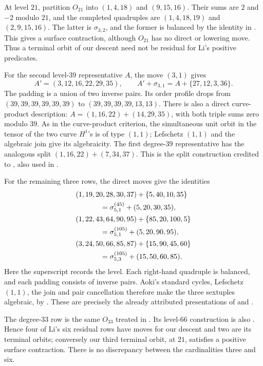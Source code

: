 At level $21$, partition $O_{21}$ into $(1,4,18)$ and $(9,15,16)$.
Their sums are $2$ and $-2$ modulo $21$, and the completed quadruples
are $(1,4,18,19)$ and $(2,9,15,16)$. The latter is
$\sigma_{3,2}$, and the former is balanced by the identity in
. This gives a surface contraction, although
$O_{21}$ has no direct or lowering move. Thus a terminal orbit of our
descent need not be residual for Li's positive predicates.

For the second level-$39$ representative $A$, the move $(3,1)$ gives
\[
 A'=(3,12,16,22,29,35),\qquad
 A'+\sigma_{3,1}=A+\{27,12,3,36\}.
\]
The padding is a union of two inverse pairs. Its order profile drops
from $(39,39,39,39,39,39)$ to $(39,39,39,39,13,13)$.
There is also a direct curve-product description:
$A=(1,16,22)+(14,29,35)$, with both triple sums zero modulo $39$.
As in the curve-product criterion, the simultaneous unit orbit in the
tensor of the two curve $H^1$'s is of type $(1,1)$; Lefschetz $(1,1)$
and the algebraic join give its algebraicity. The first degree-$39$
representative has the analogous split $(1,16,22)+(7,34,37)$.
This is the split construction credited to \cite{Jum26}, also used in
\cite[\S3.2]{Li26b}.

For the remaining three rows, the direct moves give the identities
\begin{align*}
 &(1,19,20,28,30,37)+\{5,40,10,35\}\\
 &\hspace{12mm}=\sigma_{5,1}^{(45)}+(5,20,30,35),\\
 &(1,22,43,64,90,95)+\{85,20,100,5\}\\
 &\hspace{12mm}=\sigma_{5,1}^{(105)}+(5,20,90,95),\\
 &(3,24,50,66,85,87)+\{15,90,45,60\}\\
 &\hspace{12mm}=\sigma_{5,3}^{(105)}+(15,50,60,85).
\end{align*}
Here the superscript records the level. Each right-hand quadruple is
balanced, and each padding consists of inverse pairs. Aoki's standard
cycles, Lefschetz $(1,1)$, the join and pair cancellation therefore make
the three sextuples algebraic, by .
These are precisely the already attributed presentations of
\cite{Jum26} and \cite[(3.4)--(3.5)]{Li26b}.

The degree-$33$ row is the same $O_{33}$ treated in
. Its level-$66$ construction is also
\cite[Theorem~1.4]{Jum26}. Hence four of Li's six residual rows have
moves for our descent and two are its terminal orbits; conversely our
third terminal orbit, at $21$, satisfies a positive surface contraction.
There is no discrepancy between the cardinalities three and six.

